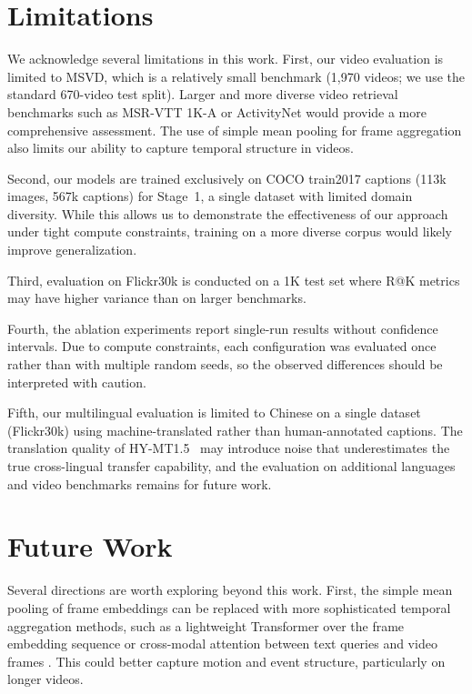 \documentclass[10pt,leqno]{amsart}
\begin{document}
\section{Limitations}

We acknowledge several limitations in this work. First, our video evaluation is limited to MSVD, which is a relatively small benchmark (1,970 videos; we use the standard 670-video test split). Larger and more diverse video retrieval benchmarks such as MSR-VTT 1K-A or ActivityNet would provide a more comprehensive assessment. The use of simple mean pooling for frame aggregation also limits our ability to capture temporal structure in videos.

Second, our models are trained exclusively on COCO train2017 captions (113k images, 567k captions) for Stage~1, a single dataset with limited domain diversity. While this allows us to demonstrate the effectiveness of our approach under tight compute constraints, training on a more diverse corpus would likely improve generalization.

Third, evaluation on Flickr30k is conducted on a 1K test set where R@K metrics may have higher variance than on larger benchmarks.

Fourth, the ablation experiments report single-run results without confidence intervals. Due to compute constraints, each configuration was evaluated once rather than with multiple random seeds, so the observed differences should be interpreted with caution.

Fifth, our multilingual evaluation is limited to Chinese on a single dataset (Flickr30k) using machine-translated rather than human-annotated captions. The translation quality of HY-MT1.5~\citep{hymt152025tencent} may introduce noise that underestimates the true cross-lingual transfer capability, and the evaluation on additional languages and video benchmarks remains for future work.

\section{Future Work}

Several directions are worth exploring beyond this work. First, the simple mean pooling of frame embeddings can be replaced with more sophisticated temporal aggregation methods, such as a lightweight Transformer over the frame embedding sequence or cross-modal attention between text queries and video frames \citep{gorti2022xpool}. This could better capture motion and event structure, particularly on longer videos.
\end{document}
